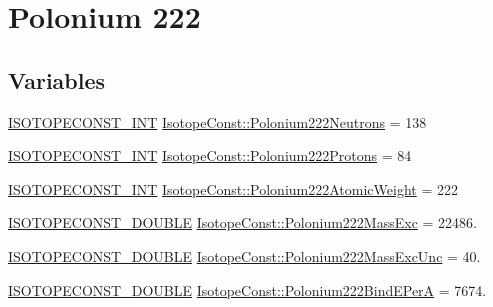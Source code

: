 \hypertarget{group___isotope_const-_polonium-_po222}{}\section{Polonium 222}
\label{group___isotope_const-_polonium-_po222}
\subsection*{Variables}
\begin{DoxyCompactItemize}
\item 
\mbox{\hyperlink{group___isotope_const-_macros_ga5f18360b3e99483a35c32d789e62621c}{I\+S\+O\+T\+O\+P\+E\+C\+O\+N\+S\+T\+\_\+\+I\+NT}} \mbox{\hyperlink{group___isotope_const-_polonium-_po222_ga76d703c88bf50ac8e45753a16b741c48}{Isotope\+Const\+::\+Polonium222\+Neutrons}} = 138
\item 
\mbox{\hyperlink{group___isotope_const-_macros_ga5f18360b3e99483a35c32d789e62621c}{I\+S\+O\+T\+O\+P\+E\+C\+O\+N\+S\+T\+\_\+\+I\+NT}} \mbox{\hyperlink{group___isotope_const-_polonium-_po222_gab14a8c18be93b3e76caa416d22e50abd}{Isotope\+Const\+::\+Polonium222\+Protons}} = 84
\item 
\mbox{\hyperlink{group___isotope_const-_macros_ga5f18360b3e99483a35c32d789e62621c}{I\+S\+O\+T\+O\+P\+E\+C\+O\+N\+S\+T\+\_\+\+I\+NT}} \mbox{\hyperlink{group___isotope_const-_polonium-_po222_gabbf20ea8af74bd27ba3dc85e10d5f71f}{Isotope\+Const\+::\+Polonium222\+Atomic\+Weight}} = 222
\item 
\mbox{\hyperlink{group___isotope_const-_macros_ga8f45a7272ce02c0b4c65c44636ed719a}{I\+S\+O\+T\+O\+P\+E\+C\+O\+N\+S\+T\+\_\+\+D\+O\+U\+B\+LE}} \mbox{\hyperlink{group___isotope_const-_polonium-_po222_ga3364ea317892fee96a1e4bc03c319d24}{Isotope\+Const\+::\+Polonium222\+Mass\+Exc}} = 22486.
\item 
\mbox{\hyperlink{group___isotope_const-_macros_ga8f45a7272ce02c0b4c65c44636ed719a}{I\+S\+O\+T\+O\+P\+E\+C\+O\+N\+S\+T\+\_\+\+D\+O\+U\+B\+LE}} \mbox{\hyperlink{group___isotope_const-_polonium-_po222_ga6dc7a7dfa28e2176400694c52931fb87}{Isotope\+Const\+::\+Polonium222\+Mass\+Exc\+Unc}} = 40.
\item 
\mbox{\hyperlink{group___isotope_const-_macros_ga8f45a7272ce02c0b4c65c44636ed719a}{I\+S\+O\+T\+O\+P\+E\+C\+O\+N\+S\+T\+\_\+\+D\+O\+U\+B\+LE}} \mbox{\hyperlink{group___isotope_const-_polonium-_po222_gabc3fb623ee57f871021c533561b3aca6}{Isotope\+Const\+::\+Polonium222\+Bind\+E\+PerA}} = 7674.
\item 

\end{DoxyCompactItemize}
